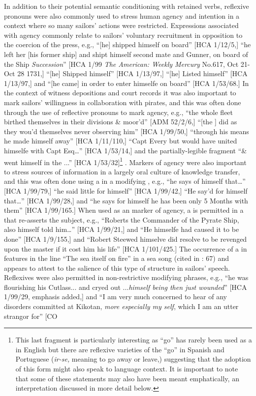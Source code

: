 In addition to their potential semantic conditioning with retained  verbs, reflexive pronouns were also commonly used to stress human agency and intention in a context where so many sailors’ actions were restricted. Expressions associated with  agency commonly relate to sailors’ voluntary recruitment in opposition to the coercion of the press, e.g., “[he] shipped himself on board” [HCA 1/12/5,] “he left her [his former ship] and shipt himself second mate and Gunner, on board of the Ship \textit{Succession}” [HCA 1/99 \textit{The American: Weekly Mercury} No.617, Oct 21-Oct 28 1731,] “[he] Shipped himself” [HCA 1/13/97,] “[he] Listed himself” [HCA 1/13/97,] and “[he came] in order to enter himselfe on board” [HCA 1/53/68.] In the context of witness depositions and court records it was also important to mark sailors’ willingness in collaboration with pirates, and this was often done through the use of reflective pronouns to mark agency, e.g., “the whole fleet birthed themselves in their divisions \& moor’d” [ADM 52/2/6,] “[the ] did as they wou’d themselves never observing him” [HCA 1/99/50,] “through his means he made himself away” [HCA 1/11/110,] “Capt Every but would have united himselfe with Capt Esq…” [HCA 1/53/14,] and the partially-legible fragment “\& went himself in the ...” [HCA 1/53/32]\footnote{This last fragment is particularly interesting as “go” has rarely been used as a  in English but there are reflexive varieties of the  “go” in Spanish and Portuguese (\textit{ir-se,} meaning to go away or leave,) suggesting that the adoption of this form might also speak to language context. It is important to note that some of these statements may also have been meant emphatically, an interpretation discussed in more detail below.} . Markers of agency were also important to stress sources of information in a largely oral culture of knowledge transfer, and this was often done using a  in a modifying , e.g., “he says of himself that…” [HCA 1/99/79,] “he said little for himself” [HCA 1/99/42,] “He say’d for himself that…” [HCA 1/99/28,] and “he says for himself he has been only 5 Months with them” [HCA 1/99/165.] When used as an  marker of agency, a  is permitted in a  that re-asserts the  subject, e.g., “Roberts the Commander of the Pyrate Ship, also himself told him…” [HCA 1/99/21,] and “He himselfe had caused it to be done” [HCA 1/9/155,] and “Robert Steewed himselve did resolve to be revenged upon the master if it cost him his life” [HCA 1/101/425.] The occurrence of a  in  features in the line “The sea itself on fire” in a  sea song (cited in \citealt{Palmer1986}: 67) and appears to attest to the salience of this type of structure in sailors’ speech. Reflexives were also permitted in non-restrictive modifying phrases, e.g., “he was flourishing his Cutlass... and cryed out ...\textit{himself being then just wounded}” [HCA 1/99/29, emphasis added,] and “I am very much concerned to hear of any disorders committed at Kikotan, \textit{more especially my self}, which I am an utter strangor for” [CO 